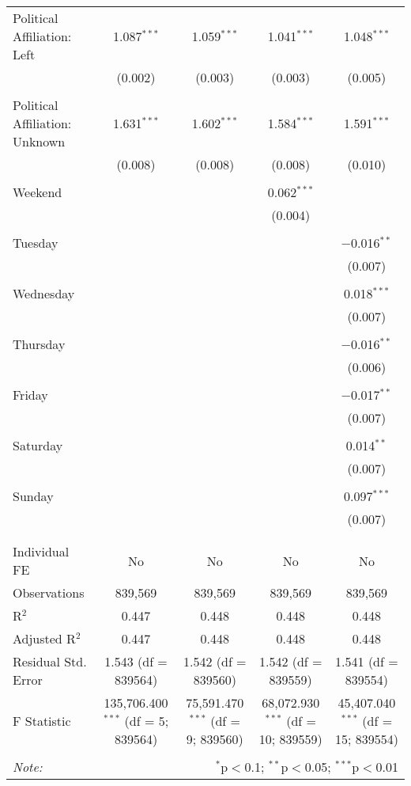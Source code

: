 \documentclass[
]{article}
\begin{document}
\begin{table}[!htbp]
{\begin{tabular}{@{\extracolsep{5pt}}lcccc}
 Political Affiliation: Left & 1.087$^{***}$ & 1.059$^{***}$ & 1.041$^{***}$ & 1.048$^{***}$ \\ 
  & (0.002) & (0.003) & (0.003) & (0.005) \\ 
  & & & & \\ 
 Political Affiliation: Unknown & 1.631$^{***}$ & 1.602$^{***}$ & 1.584$^{***}$ & 1.591$^{***}$ \\ 
  & (0.008) & (0.008) & (0.008) & (0.010) \\ 
  & & & & \\ 
 Weekend &  &  & 0.062$^{***}$ &  \\ 
  &  &  & (0.004) &  \\ 
  & & & & \\ 
 Tuesday &  &  &  & $-$0.016$^{**}$ \\ 
  &  &  &  & (0.007) \\ 
  & & & & \\ 
 Wednesday &  &  &  & 0.018$^{***}$ \\ 
  &  &  &  & (0.007) \\ 
  & & & & \\ 
 Thursday &  &  &  & $-$0.016$^{**}$ \\ 
  &  &  &  & (0.006) \\ 
  & & & & \\ 
 Friday &  &  &  & $-$0.017$^{**}$ \\ 
  &  &  &  & (0.007) \\ 
  & & & & \\ 
 Saturday &  &  &  & 0.014$^{**}$ \\ 
  &  &  &  & (0.007) \\ 
  & & & & \\ 
 Sunday &  &  &  & 0.097$^{***}$ \\ 
  &  &  &  & (0.007) \\ 
  & & & & \\ 
\hline \\[-1.8ex] 
Individual FE & No & No & No & No \\ 
Observations & 839,569 & 839,569 & 839,569 & 839,569 \\ 
R$^{2}$ & 0.447 & 0.448 & 0.448 & 0.448 \\ 
Adjusted R$^{2}$ & 0.447 & 0.448 & 0.448 & 0.448 \\ 
Residual Std. Error & 1.543 (df = 839564) & 1.542 (df = 839560) & 1.542 (df = 839559) & 1.541 (df = 839554) \\ 
F Statistic & 135,706.400$^{***}$ (df = 5; 839564) & 75,591.470$^{***}$ (df = 9; 839560) & 68,072.930$^{***}$ (df = 10; 839559) & 45,407.040$^{***}$ (df = 15; 839554) \\ 
\hline 
\hline \\[-1.8ex] 
\textit{Note:}  & \multicolumn{4}{r}{$^{*}$p$<$0.1; $^{**}$p$<$0.05; $^{***}$p$<$0.01} \\ 
\end{tabular}
} 
\end{table} 
\newpage
\end{document}
